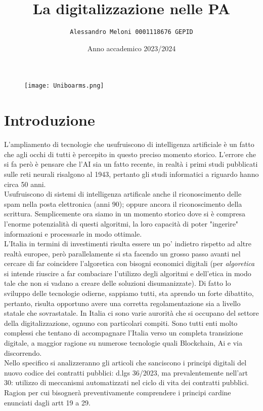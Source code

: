 \documentclass{article}
\title{\huge\textbf{La digitalizzazione nelle PA}}
\author{\texttt{Alessandro Meloni 0001118676 GEPID}}
\date{Anno accademico 2023/2024}
\begin{document}
\begin{figure}
    \centering
    \texttt{[image: Uniboarms.png]}
\end{figure}
\maketitle

\centering \tableofcontents

\newpage\centering
\section{Introduzione}
\begin{justify}
L'ampliamento di tecnologie che usufruiscono di intelligenza artificiale è un fatto che agli occhi di tutti è percepito in questo preciso momento storico. L'errore che si fa però è pensare che l'AI sia un fatto recente, in realtà i primi studi pubblicati sulle reti neurali risalgono al 1943, pertanto gli studi informatici a riguardo hanno circa 50 anni.\citep{mcculloch1943logical}\\ Usufruiscono di sistemi di intelligenza artificale anche il riconoscimento delle spam nella posta elettronica (anni 90); oppure ancora il riconoscimento della scrittura. Semplicemente ora siamo in un momento storico dove si è compresa l'enorme potenzialità di questi algoritmi, la loro capacità di poter "ingerire" informazioni e processarle in modo ottimale.\\
L'Italia in termini di investimenti risulta essere un po' indietro rispetto ad altre realtà europee, però parallelamente si sta facendo un grosso passo avanti nel cercare di far coincidere l'algoretica con bisogni economici digitali (per \textit{algoretica} si intende riuscire a far combaciare l'utilizzo degli algoritmi e dell'etica in modo tale che non si vadano a creare delle soluzioni disumanizzate).
Di fatto lo sviluppo delle tecnologie odierne, sappiamo tutti, sta aprendo un forte dibattito, pertanto, risulta opportuno avere una corretta regolamentazione sia a livello statale che sovrastatale.
In Italia ci sono varie aurorità che si occupano del settore della digitalizzazione, ognuno con particolari compiti.
Sono tutti enti molto complessi che tentano di accompagnare l'Italia verso un completa transizione digitale, a maggior ragione su numerose tecnologie quali Blockchain, Ai e via discorrendo.\\
Nello specifico si analizzeranno gli articoli che sanciscono i principi digitali del nuovo codice dei contratti pubblici: d.lgs 36/2023, ma prevalentemente nell'art 30: utilizzo di meccanismi automatizzati nel ciclo di vita dei contratti pubblici. Ragion per cui bisognerà preventivamente comprendere i principi cardine enunciati dagli artt 19 a 29.\\

\end{justify}
\end{document}
